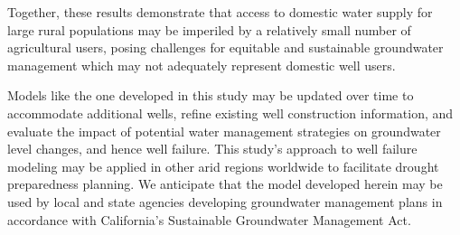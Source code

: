 Together, these results demonstrate that access to domestic water supply for large rural populations may be imperiled by a relatively small number of agricultural users, posing challenges for equitable and sustainable groundwater management which may not adequately represent domestic well users. 

Models like the one developed in this study may be updated over time to accommodate additional wells, refine existing well construction information, and evaluate the impact of potential water management strategies on groundwater level changes, and hence well failure. This study's approach to well failure modeling may be applied in other arid regions worldwide to facilitate drought preparedness planning. We anticipate that the model developed herein may be used by local and state agencies developing groundwater management plans in accordance with California's Sustainable Groundwater Management Act.  

\clearpage
